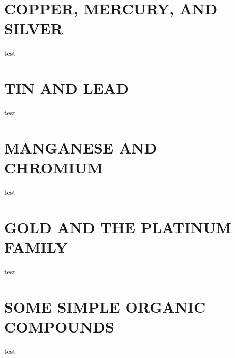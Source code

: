 \documentclass[11pt]{book}
\begin{document}
\chapter{COPPER, MERCURY, AND SILVER}
test
\chapter{TIN AND LEAD}
test
\chapter{MANGANESE AND CHROMIUM}
test
\chapter{GOLD AND THE PLATINUM FAMILY}
test
\chapter{SOME SIMPLE ORGANIC COMPOUNDS}
test
\end{document}
